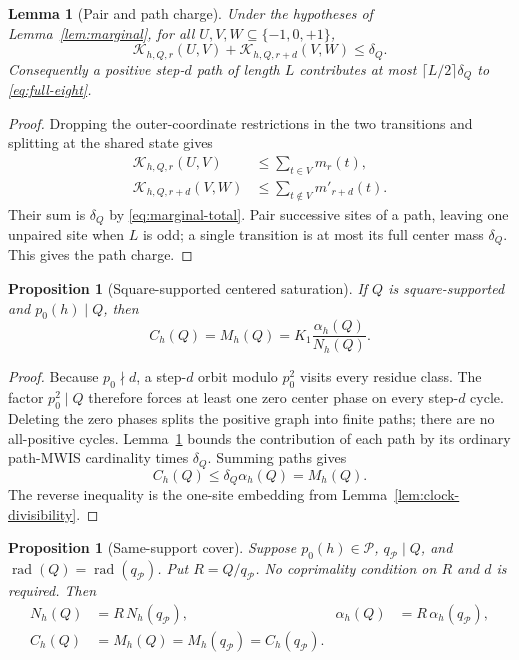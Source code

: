 \documentclass[11pt]{article}
\newtheorem{proposition}[theorem]{Proposition}
\newtheorem{lemma}[theorem]{Lemma}
\theoremstyle{definition}
\theoremstyle{remark}
\newcommand{\T}{\{-1,0,+1\}}
\newcommand{\rad}{\operatorname{rad}}
\begin{document}
\begin{lemma}[Pair and path charge]
\label{lem:path-charge}
Under the hypotheses of Lemma~\ref{lem:marginal}, for all
\(U,V,W\subseteq\T\),
\begin{equation}
 \mathcal K_{h,Q,r}(U,V)
 +\mathcal K_{h,Q,r+d}(V,W)\leq\delta_Q.
 \label{eq:pair-charge}
\end{equation}
Consequently a positive step-\(d\) path of length \(L\) contributes at
most \(\lceil L/2\rceil\delta_Q\) to
\eqref{eq:full-eight}.
\end{lemma}

\begin{proof}
Dropping the outer-coordinate restrictions in the two transitions and
splitting at the shared state gives
\begin{align*}
 \mathcal K_{h,Q,r}(U,V)
 &\leq\sum_{t\in V}m_r(t),\\
 \mathcal K_{h,Q,r+d}(V,W)
 &\leq\sum_{t\notin V}m'_{r+d}(t).
\end{align*}
Their sum is \(\delta_Q\) by \eqref{eq:marginal-total}.  Pair successive
sites of a path, leaving one unpaired site when \(L\) is odd; a single
transition is at most its full center mass \(\delta_Q\).  This gives the
path charge.
\end{proof}

\begin{proposition}[Square-supported centered saturation]
\label{prop:square-saturation}
If \(Q\) is square-supported and \(p_0(h)\mid Q\), then
\begin{equation}
 \boxed{C_h(Q)=M_h(Q)
 =K_1\frac{\alpha_h(Q)}{N_h(Q)}.}
 \label{eq:square-saturation}
\end{equation}
\end{proposition}

\begin{proof}
Because \(p_0\nmid d\), a step-\(d\) orbit modulo \(p_0^2\) visits every
residue class.  The factor \(p_0^2\mid Q\) therefore forces at least one
zero center phase on every step-\(d\) cycle.  Deleting the zero phases
splits the positive graph into finite paths; there are no all-positive
cycles.  Lemma~\ref{lem:path-charge} bounds the contribution of each path
by its ordinary path-MWIS cardinality times \(\delta_Q\).  Summing paths
gives
\[
 C_h(Q)\leq\delta_Q\alpha_h(Q)=M_h(Q).
\]
The reverse inequality is the one-site embedding from
Lemma~\ref{lem:clock-divisibility}.
\end{proof}

\begin{proposition}[Same-support cover]
\label{prop:same-support}
Suppose \(p_0(h)\in\mathcal P\),
\(q_{\mathcal P}\mid Q\), and
\(\rad(Q)=\rad(q_{\mathcal P})\).  Put
\(R=Q/q_{\mathcal P}\).  No coprimality condition on \(R\) and \(d\) is
required.  Then
\begin{align}
 N_h(Q)&=R\,N_h(q_{\mathcal P}),&
 \alpha_h(Q)&=R\,\alpha_h(q_{\mathcal P}),\label{eq:cover-counts}\\
 C_h(Q)&=M_h(Q)=M_h(q_{\mathcal P})=C_h(q_{\mathcal P}).
 \label{eq:cover-capacity}
\end{align}
\end{proposition}
\end{document}

